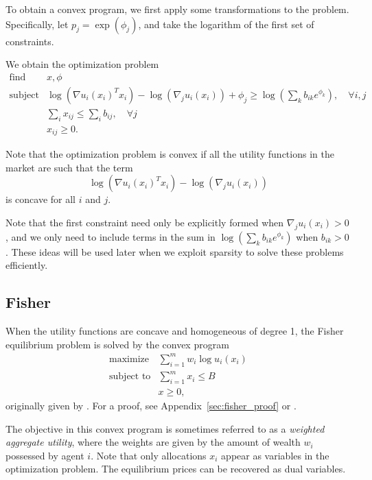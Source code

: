 \documentclass[12pt]{article}
\begin{document}
To obtain a convex program, we first apply some transformations to the
problem.
Specifically, let $p_j = \exp(\phi_j)$, and take the logarithm of
the first set of constraints.

We obtain the optimization problem %
\begin{equation}
\label{p-exchange}
\begin{array}{ll}
\mbox{find} & x, \phi \\
\mbox{subject to} & \log(\nabla u_i(x_i)^T x_i) - \log(\nabla_j u_i(x_i)) + \phi_j 
\geq \log(\sum_k b_{ik} e^{\phi_k}),\quad \forall i,j\\
& \sum_i x_{ij} \leq \sum_i b_{ij},\quad \forall j\\
& x_{ij} \geq 0.
\end{array}
\end{equation}

Note that the optimization problem is convex if all the utility functions
in the market are such that the term
\[
\log(\nabla u_i(x_i)^T x_i) - \log(\nabla_j u_i(x_i))
\]
is concave for all $i$ and $j$.

Note that the first constraint need only be explicitly formed when
$\nabla_j u_i(x_i) > 0$, and we only need to include terms in the sum in
$\log(\sum_k b_{ik} e^{\phi_k})$ when $b_{ik} > 0$.
These ideas will be used later when we exploit sparsity to solve these
problems efficiently.

\subsection{Fisher}

When the utility functions are concave and homogeneous of degree 1,
the Fisher equilibrium problem is solved by the convex program
\begin{equation}
\label{p-fisher}
\begin{array}{ll}
\mbox{maximize} & \sum_{i=1}^m w_i \log u_i(x_i) \\
\mbox{subject to} & \sum_{i=1}^m x_i \leq B\\
& x \geq 0,
\end{array}
\end{equation}
originally given by \cite{eisenberg1959consensus, gale1960theory, eisenberg1961aggregation}.
For a proof, see Appendix~\ref{sec:fisher_proof} or \cite[\S~6.2]{nisan2007algorithmic}.

The objective in this convex program is sometimes referred to as a \emph{weighted aggregate utility}, where the weights are given by the amount
of wealth $w_i$ possessed by agent $i$.
Note that only allocations $x_i$ appear as variables in the optimization
problem.
The equilibrium prices can be recovered as dual variables.
\end{document}
